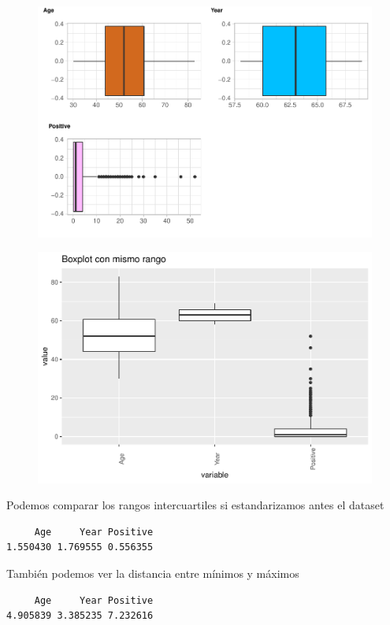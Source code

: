 \begin{figure}[H]\includegraphics[width=.9\linewidth]{img/EDA2_files/figure-latex/unnamed-chunk-11-4} \end{figure}

\begin{figure}[H]\includegraphics[width=.9\linewidth]{img/EDA2_files/figure-latex/unnamed-chunk-12-1} \end{figure}

\vspace{\baselineskip}

Podemos comparar los rangos intercuartiles si estandarizamos antes el dataset
\begin{verbatim}
     Age     Year Positive 
1.550430 1.769555 0.556355 
\end{verbatim}

También podemos ver la distancia entre mínimos y máximos

\begin{verbatim}
     Age     Year Positive 
4.905839 3.385235 7.232616 
\end{verbatim}

